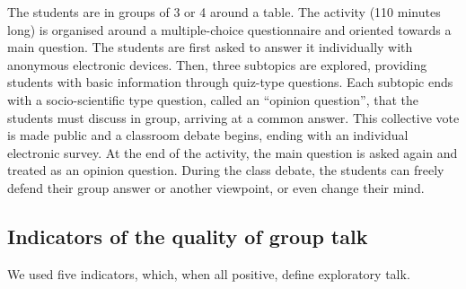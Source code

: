 \documentclass[output=paper]{langscibook}
\begin{document}
The students are in groups of 3 or 4 around a table. The activity (110 minutes long) is organised around a multiple-choice questionnaire and oriented towards a main question. The students are first asked to answer it individually with anonymous electronic devices. Then, three subtopics are explored, providing students with basic information through quiz-type questions. Each subtopic ends with a socio-scientific type question, called an “opinion question”, that the students must discuss in group, arriving at a common answer. This collective vote is made public and a classroom debate begins, ending with an individual electronic survey. At the end of the activity, the main question is asked again and treated as an opinion question. During the class debate, the students can freely defend their group answer or another viewpoint, or even change their mind. 

\subsection{Indicators of the quality of group talk}

We used five indicators, which, when all positive, define exploratory talk.
\end{document}
